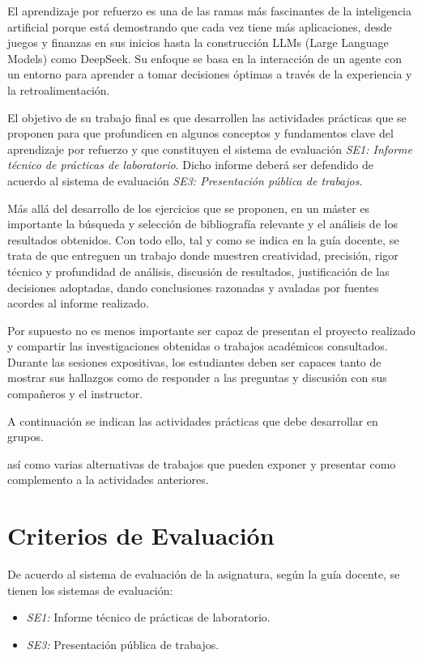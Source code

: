 \documentclass[a4paper, 11pt]{article}
\begin{document}
El aprendizaje por refuerzo es una de las ramas más fascinantes de la inteligencia artificial porque está demostrando que cada vez tiene más aplicaciones, desde juegos y finanzas en sus inicios hasta la construcción LLMs (Large Language Models) como DeepSeek. Su enfoque se basa en la interacción de un agente con un entorno para aprender a tomar decisiones óptimas a través de la experiencia y la retroalimentación.  


El objetivo de su trabajo final es que desarrollen las actividades prácticas que se proponen para  que profundicen  en algunos conceptos y fundamentos clave del aprendizaje por refuerzo y que constituyen el sistema de evaluación \textit{SE1: Informe técnico de prácticas de laboratorio}. Dicho informe deberá ser defendido de acuerdo al sistema de evaluación \textit{SE3: Presentación pública de trabajos}.


Más allá del desarrollo de los ejercicios que se proponen, en un máster es importante la búsqueda y selección de bibliografía relevante y el análisis de los resultados obtenidos. 
Con todo  ello, tal y como se indica en la guía docente, se trata de que entreguen un trabajo donde muestren creatividad, precisión, rigor técnico y profundidad de análisis, discusión de resultados, justificación de las decisiones adoptadas, dando conclusiones razonadas y avaladas por fuentes acordes al informe realizado. 

Por supuesto no es menos importante ser capaz de  presentan el proyecto realizado y compartir las investigaciones obtenidas o trabajos académicos consultados. Durante las sesiones expositivas, los estudiantes deben ser capaces tanto de mostrar sus hallazgos como de responder a las preguntas y discusión con sus compañeros y el instructor. 


A continuación se indican las actividades prácticas que debe desarrollar en grupos.


 así como varias alternativas de trabajos que pueden exponer y presentar como complemento a la actividades anteriores.



\section{Criterios de Evaluación}

De acuerdo al sistema de evaluación de la asignatura, según la guía docente, se tienen los sistemas de evaluación:
\begin{itemize}
\item \textit{SE1:} Informe técnico de prácticas de laboratorio. 
\item\textit{SE3:} Presentación pública de trabajos.
\end{itemize}
\end{document}
